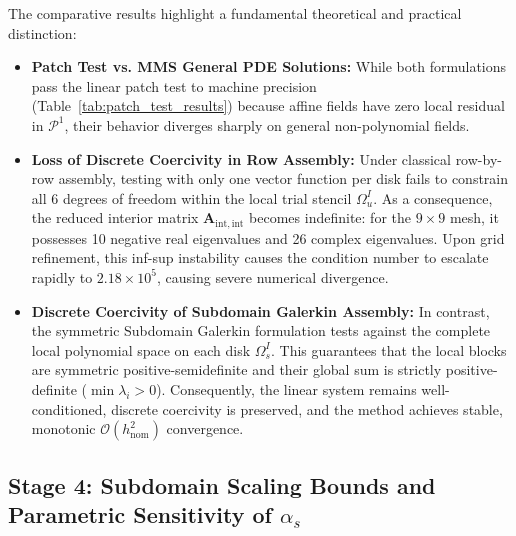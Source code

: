 \documentclass[VANCOUVER,Times1COL]{WileyNJD-v5}
\begin{document}
The comparative results highlight a fundamental theoretical and practical distinction:
\begin{itemize}
    \item \textbf{Patch Test vs. MMS General PDE Solutions:} While both formulations pass the linear patch test to machine precision (Table~\ref{tab:patch_test_results}) because affine fields have zero local residual in $\mathcal{P}^1$, their behavior diverges sharply on general non-polynomial fields.
    \item \textbf{Loss of Discrete Coercivity in Row Assembly:} Under classical row-by-row assembly, testing with only one vector function per disk fails to constrain all 6 degrees of freedom within the local trial stencil $\Omega_u^I$. As a consequence, the reduced interior matrix $\mathbf{A}_{\mathrm{int}, \mathrm{int}}$ becomes indefinite: for the $9 \times 9$ mesh, it possesses 10 negative real eigenvalues and 26 complex eigenvalues. Upon grid refinement, this inf-sup instability causes the condition number to escalate rapidly to $2.18 \times 10^5$, causing severe numerical divergence.
    \item \textbf{Discrete Coercivity of Subdomain Galerkin Assembly:} In contrast, the symmetric Subdomain Galerkin formulation tests against the complete local polynomial space on each disk $\Omega_s^I$. This guarantees that the local blocks are symmetric positive-semidefinite and their global sum is strictly positive-definite ($\min \lambda_i > 0$). Consequently, the linear system remains well-conditioned, discrete coercivity is preserved, and the method achieves stable, monotonic $\mathcal{O}(h_{\mathrm{nom}}^2)$ convergence.
\end{itemize}

\subsection{Stage 4: Subdomain Scaling Bounds and Parametric Sensitivity of $\alpha_s$}
\label{subsec:stage4_alpha_s}
\end{document}
